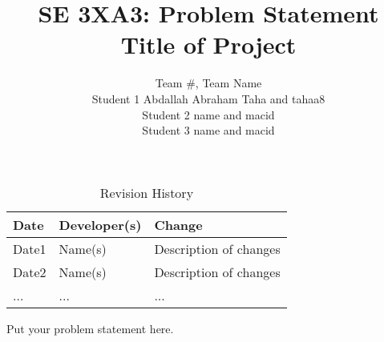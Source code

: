 \documentclass{article}
\title{SE 3XA3: Problem Statement\\Title of Project}
\author{Team \#, Team Name
		\\ Student 1 Abdallah Abraham Taha and tahaa8
		\\ Student 2 name and macid
		\\ Student 3 name and macid
}
\date{}
\begin{document}
\begin{table}[hp]
\caption{Revision History} \label{TblRevisionHistory}
\begin{tabularx}{\textwidth}{llX}
\toprule
\textbf{Date} & \textbf{Developer(s)} & \textbf{Change}\\
\midrule
Date1 & Name(s) & Description of changes\\
Date2 & Name(s) & Description of changes\\
... & ... & ...\\
\bottomrule
\end{tabularx}
\end{table}

\newpage

\maketitle

Put your problem statement here.





\end{document}
